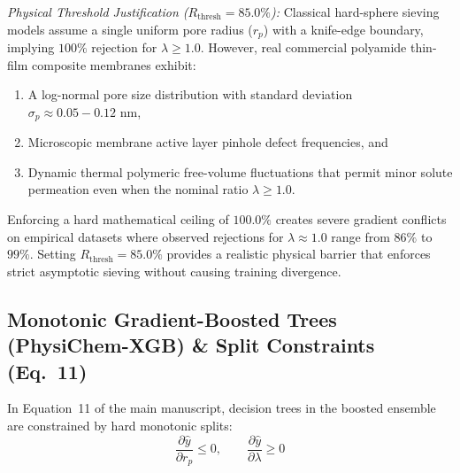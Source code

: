 \documentclass[11pt]{article}
\begin{document}
\noindent\textit{Physical Threshold Justification ($R_{\mathrm{thresh}} = 85.0\%$):} Classical hard-sphere sieving models assume a single uniform pore radius ($r_p$) with a knife-edge boundary, implying $100\%$ rejection for $\lambda \ge 1.0$. However, real commercial polyamide thin-film composite membranes exhibit:
\begin{enumerate}[leftmargin=1.0cm]
    \item A log-normal pore size distribution with standard deviation $\sigma_p \approx 0.05 - 0.12\text{ nm}$,
    \item Microscopic membrane active layer pinhole defect frequencies, and
    \item Dynamic thermal polymeric free-volume fluctuations that permit minor solute permeation even when the nominal ratio $\lambda \ge 1.0$.
\end{enumerate}
Enforcing a hard mathematical ceiling of $100.0\%$ creates severe gradient conflicts on empirical datasets where observed rejections for $\lambda \approx 1.0$ range from $86\%$ to $99\%$. Setting $R_{\mathrm{thresh}} = 85.0\%$ provides a realistic physical barrier that enforces strict asymptotic sieving without causing training divergence.

\subsection{Monotonic Gradient-Boosted Trees (PhysiChem-XGB) \& Split Constraints (Eq.~11)}
\label{sec:xgb_monotonic_derivation}

In Equation~11 of the main manuscript, decision trees in the boosted ensemble are constrained by hard monotonic splits:
\begin{equation}
\frac{\partial \hat{y}}{\partial r_p} \leq 0, \qquad \frac{\partial \hat{y}}{\partial \lambda} \geq 0
\label{eq:s_monotonic}
\end{equation}
\end{document}
